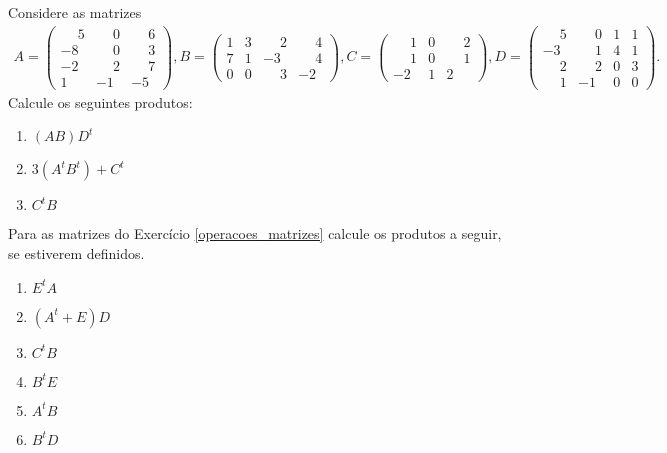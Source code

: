 \documentclass[12pt]{exam}
\begin{document}
\begin{exercicio}
    Considere as matrizes
    \begin{align*}
        A = \begin{pmatrix}\phantom{-} 5 & \phantom{-} 0 & \phantom{-} 6\\-8 & \phantom{-} 0 & \phantom{-} 3\\-2 & \phantom{-} 2 & \phantom{-} 7\\1 & -1 & -5\end{pmatrix},
        B = \begin{pmatrix}1 & 3 & \phantom{-} 2 & \phantom{-} 4\\7 & 1 & -3 & \phantom{-} 4\\0 & 0 & \phantom{-} 3 & -2\end{pmatrix},
        C = \begin{pmatrix}\phantom{-} 1 & 0 & \phantom{-} 2\\\phantom{-} 1 & 0 & \phantom{-} 1\\-2 & 1 & 2\end{pmatrix},
        D = \begin{pmatrix}\phantom{-} 5 & \phantom{-} 0 & 1 & 1\\-3 & \phantom{-} 1 & 4 & 1\\\phantom{-} 2 & \phantom{-} 2 & 0 & 3\\\phantom{-} 1 & -1 & 0 & 0\end{pmatrix}.
    \end{align*}
    Calcule os seguintes produtos:
    \begin{enumerate}[label={\alph*})]
        \item $(AB)D^t$
        \item $3(A^tB^t) + C^t$
        \item $C^tB$
    \end{enumerate}
\end{exercicio}

\begin{exercicio}
    Para as matrizes do Exercício \ref{operacoes_matrizes} calcule os produtos a seguir, se estiverem definidos.
    \begin{enumerate}[label={\alph*})]
        \item $E^tA$
        \item $(A^t + E)D$
        \item $C^tB$
        \item $B^tE$
        \item $A^tB$
        \item $B^tD$
    \end{enumerate}
\end{exercicio}
\end{document}

